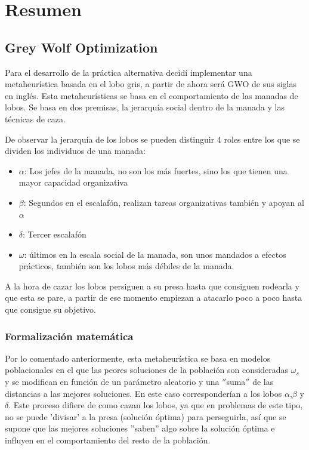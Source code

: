 \documentclass[a4paper]{report}
\begin{document}
\tableofcontents


\section{Resumen}\label{sec:resumen}

\subsection{Grey Wolf Optimization}

Para el desarrollo de la práctica alternativa decidí implementar una metaheurística basada en el lobo gris, a partir de ahora será GWO de sus siglas en inglés. Esta metaheurísticas se basa en el comportamiento de las manadas de lobos. Se basa en dos premisas, la jerarquía social dentro de la manada y las técnicas de caza.

De observar la jerarquía de los lobos se pueden distinguir 4 roles entre los que se dividen los individuos de una manada:
\begin{itemize}
    \item $\alpha$: Los jefes de la manada, no son los más fuertes, sino los que tienen una mayor capacidad organizativa
    \item $\beta$: Segundos en el escalafón, realizan tareas organizativas también y apoyan al $\alpha$
    \item $\delta$: Tercer escalafón
    \item $\omega$: últimos en la escala social de la manada, son unos mandados a efectos prácticos, también son los lobos más débiles de la manada.
\end{itemize}


A la hora de cazar los lobos persiguen a su presa hasta que consiguen rodearla y que esta se pare, a partir de ese momento empiezan a atacarlo poco a poco hasta que consigue su objetivo.

\subsubsection{Formalización matemática}
Por lo comentado anteriormente, esta metaheurística se basa en modelos poblacionales en el que las peores soluciones de la población son consideradas $\omega_s$ y se modifican en función de un parámetro aleatorio y una \(''\)suma\(''\) de las distancias a las mejores soluciones. En este caso corresponderían a los lobos $\alpha$,$\beta$ y $\delta$. Este proceso difiere de como cazan los lobos, ya que en problemas de este tipo, no se puede 'divisar' a la presa (solución óptima) para perseguirla, así que se supone que las mejores soluciones ''saben'' algo sobre la solución óptima e influyen en el comportamiento del resto de la población.
\end{document}
